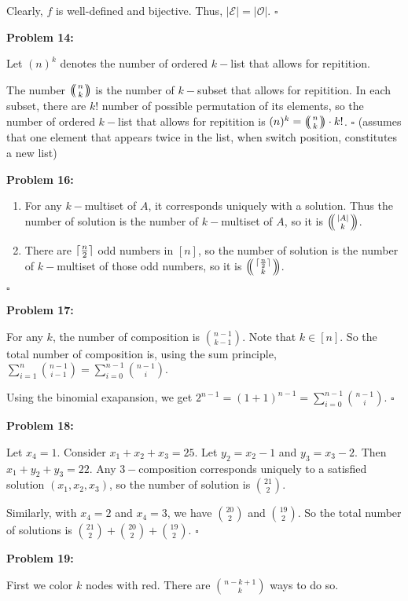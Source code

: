 \documentclass[12pt]{article}
\DeclarePairedDelimiter{\ceil}{\lceil}{\rceil}
\def\multiset#1#2{\ensuremath{\left(\kern-.3em\left(\genfrac{}{}{0pt}{}{#1}{#2}\right)\kern-.3em\right)}}
\begin{document}
Clearly, $f$ is well-defined and bijective. Thus, $|\mathcal{E}| = |\mathcal{O}|$. $\square$

\textbf{Problem 14:}

Let $(n)^k$ denotes the number of ordered $k-$list that allows for repitition.

The number $\multiset{n}{k}$ is the number of $k-$subset that allows for repitition.
In each subset, there are $k!$ number of possible permutation of its elements, so the number of ordered $k-$list that allows for repitition is $(n)^k = \multiset{n}{k} \cdot k!$. $\square$
(assumes that one element that appears twice in the list, when switch position, constitutes a new list)

\textbf{Problem 16:}

\begin{enumerate}[label=(\alph*)]
	\item For any $k-$multiset of $A$, it corresponds uniquely with a solution. Thus the number of solution is the number of $k-$multiset of $A$, so it is $\multiset{|A|}{k}$.
	\item There are $\ceil{\frac{n}{2}}$ odd numbers in $[n]$, so the number of solution is the number of $k-$multiset of those odd numbers, so it is $\multiset{\ceil{\frac{n}{2}}}{k}$.
\end{enumerate} $\square$

\textbf{Problem 17:}

For any $k$, the number of composition is $\binom{n-1}{k-1}$. Note that $k \in [n]$. So the total number of composition is, using the sum principle, $\sum\limits^{n}_{i=1} \binom{n-1}{i-1} = \sum\limits^{n-1}_{i=0} \binom{n-1}{i}$.

Using the binomial exapansion, we get $2^{n-1} = (1+1)^{n-1} =\sum\limits^{n-1}_{i=0} \binom{n-1}{i}$. $\square$

\textbf{Problem 18:}

Let $x_4 = 1$. Consider $x_1 + x_2 + x_3 = 25$. Let $y_2 = x_2 -1$ and $y_3 = x_3 - 2$. Then $x_1 + y_2 + y_3 = 22$. Any $3-$composition corresponds uniquely to a satisfied solution $(x_1, x_2, x_3)$, so the number of solution is $\binom{21}{2}$.

Similarly, with $x_4 = 2$ and $x_4 = 3$, we have $\binom{20}{2}$ and $\binom{19}{2}$. So the total number of solutions is $\binom{21}{2} + \binom{20}{2} + \binom{19}{2}$. $\square$

\textbf{Problem 19:}

First we color $k$ nodes with red. There are $\binom{n-k+1}{k}$ ways to do so.
\end{document}
